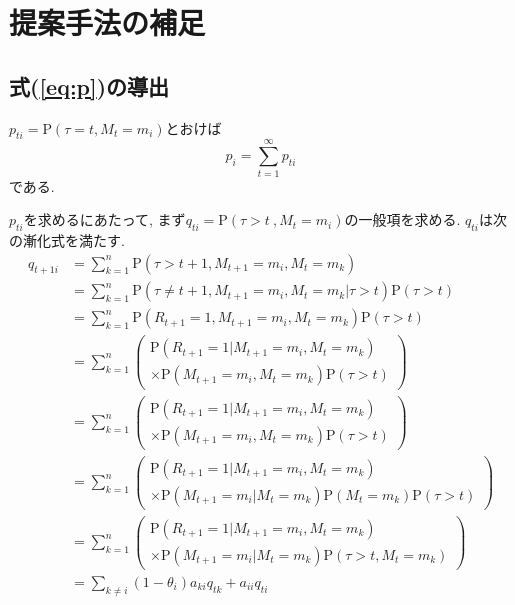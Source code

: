 \chapter{提案手法の補足}

\section{式(\ref{eq:p})の導出} \label{sect:proof_p}
$ p_{t i} = \mathrm{P}(\tau = t , M_t = m_i) $とおけば
\begin{equation} \label{eq:p_sum_pt}
    p_i = \sum_{t=1}^{\infty}p_{t i}
\end{equation}
である. 

$ p_{t i} $を求めるにあたって, まず$ q_{t i} = \mathrm{P}(\tau > t\ ,M_t = m_i) $の一般項を求める. 
$ q_{t i} $は次の漸化式を満たす. 
\begin{align}
    q_{t+1 i} & = \sum_{k=1}^n \mathrm{P}(\tau > t + 1 , M_{t+1} = m_i , M_t = m_k) \\
    & =\sum_{k=1}^n \mathrm{P}(\tau \ne t + 1 , M_{t+1} = m_i , M_t = m_k | \tau > t) \mathrm{P}(\tau > t) \\
    & =\sum_{k=1}^n \mathrm{P}(R_{t+1} = 1 , M_{t+1} = m_i , M_t = m_k) \mathrm{P}(\tau > t) \\
    & =\sum_{k=1}^n \left(
        \begin{array}{l}
            \mathrm{P}(R_{t+1} = 1 | M_{t+1} = m_i , M_t = m_k) \\
            \times \mathrm{P}(M_{t+1} = m_i , M_t = m_k) \mathrm{P}(\tau > t)
        \end{array}
    \right) \\
    & =\sum_{k=1}^n \left(
        \begin{array}{l}
            \mathrm{P}(R_{t+1} = 1 | M_{t+1} = m_i , M_t = m_k) \\
            \times \mathrm{P}(M_{t+1} = m_i , M_t = m_k) \mathrm{P}(\tau > t)
        \end{array}
    \right) \\
    & =\sum_{k=1}^n \left(
        \begin{array}{l}
            \mathrm{P}(R_{t+1} = 1 | M_{t+1} = m_i , M_t = m_k) \\
            \times \mathrm{P}(M_{t+1} = m_i | M_t = m_k) \mathrm{P}(M_t = m_k) \mathrm{P}(\tau > t)
        \end{array}
    \right) \\
    & =\sum_{k=1}^n \left(
        \begin{array}{l}
            \mathrm{P}(R_{t+1} = 1 | M_{t+1} = m_i , M_t = m_k) \\
            \times \mathrm{P}(M_{t+1} = m_i | M_t = m_k) \mathrm{P}(\tau > t , M_t = m_k)
        \end{array}
    \right) \\
    & =\sum_{k \ne i} (1 - \theta_i) a_{k i} q_{t k} + a_{i i} q_{t i} \label{eq:qti_rec}
\end{align}
